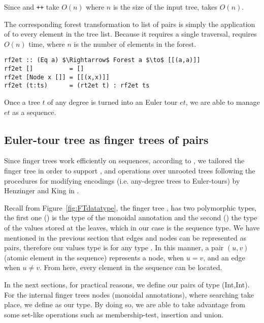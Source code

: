 Since  and \texttt{++} take $O(n)$ where $n$ is the size of the input tree,  takes $O(n)$. 

The corresponding forest transformation to list of pairs is simply the application of  to every element in the tree list. Because it requires a single traversal,  requires $O(n)$ time, where $n$ is the number of elements in the forest.

\begin{lstlisting}[mathescape] 
rf2et :: (Eq a) $\Rightarrow$ Forest a $\to$ [[(a,a)]]
rf2et []          = []
rf2et [Node x []] = [[(x,x)]]  
rf2et (t:ts)      = (rt2et t) : rf2et ts
\end{lstlisting}

Once a tree $t$ of any degree is turned into an Euler tour $et$, we are able to manage $et$ as a sequence. 


\subsection{Euler-tour tree as finger trees of pairs}

Since finger trees work efficiently on sequences, according to \cite{FTs}, we tailored the finger tree in order to support \link, \cut and \connected operations over unrooted trees following the procedures for modifying encodings (i.e. any-degree trees to Euler-tours) by Henzinger and King in \cite{Rand-DynGs-Algos}.

Recall from Figure~\ref{fig:FTdatatype}, the finger tree , has two polymorphic types, the first one () is the type of the monoidal annotation and the second () the type of the values stored at the leaves, which in our case is the sequence type. We have mentioned in the previous section that edges and nodes can be represented as pairs, therefore our values type is  for any type . In this manner, a pair $(u,v)$ (atomic element in the sequence) represents a node, when $u = v$, and an edge when $u \neq v$. From here, every element in the sequence  can be located.

In the next sections, for practical reasons, we define our pairs of type \code(Int,Int). For the internal finger trees nodes (monoidal annotations), where searching take place, we define  as our type. By doing so, we are able to take advantage from some set-like operations such as membership-test, insertion and union. 

